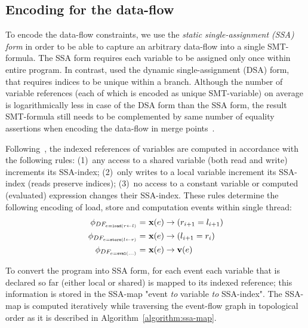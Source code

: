 \subsection{Encoding for the data-flow}
\label{ch:port:enc:df}

To encode the data-flow constraints, we use the \textit{static single-assignment (SSA) form} in order to be able to capture an arbitrary data-flow into a single SMT-formula.
The SSA form requires each variable to be assigned only once within entire program.
In contrast, \porthos{} used the dynamic single-assignment (DSA) form, that requires indices to be unique within a branch.
Although the number of variable references (each of which is encoded as unique SMT-variable) on average is logarithmically less in case of the DSA form than the SSA form, the result SMT-formula still needs to be complemented by same number of equality assertions when encoding the data-flow in merge points~\cite{Porthos17SAS}.

Following~\cite{Porthos17CoRR}, the indexed references of variables are computed in accordance with the following rules:
(1)~any access to a shared variable (both read and write) increments its SSA-index;
(2)~only writes to a local variable increment its SSA-index (reads preserve indices);
(3)~no access to a constant variable or computed (evaluated) expression changes their SSA-index.
These rules determine the following encoding of load, store and computation events within single thread:
\begin{align}
    \phi_{DF_{e = \mathtt{load}(r \leftarrow l)}} = \ & \fx(e) \rightarrow (r_{i+1} = l_{i+1}) \\
    \phi_{DF_{e = \mathtt{store}(l \leftarrow r)}} = \ & \fx(e) \rightarrow (l_{i+1} = r_i) \\
    \phi_{DF_{e = \mathtt{eval}(...)}} = \ & \fx(e) \rightarrow \fv(e) %
\end{align}

To convert the program into SSA form, for each event each variable that is declared so far (either local or shared) is mapped to its indexed reference; this information is stored in the SSA-map "event \textit{to} variable \textit{to} SSA-index". %
The SSA-map is computed iteratively while traversing the event-flow graph in topological order as it is described in Algorithm~\ref{algorithm:ssa-map}.

